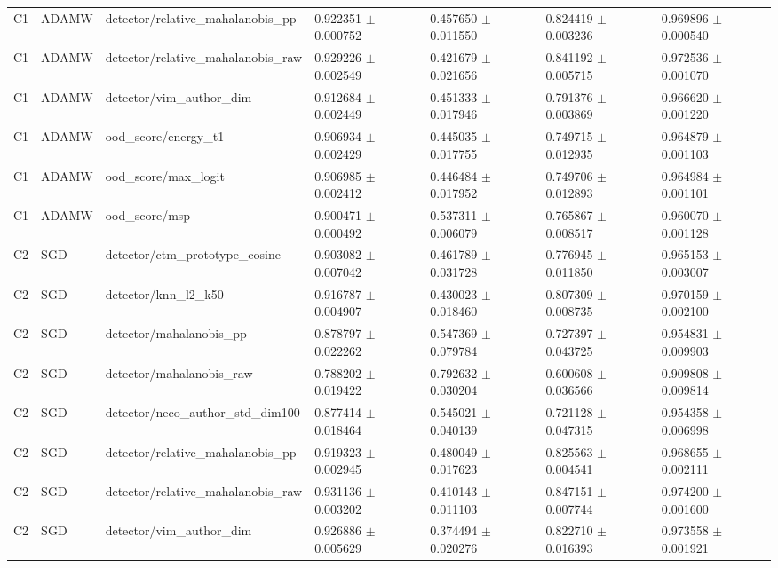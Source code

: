 \begin{longtable}{lllllll}
C1 & ADAMW & detector/relative\_mahalanobis\_pp & 0.922351 $\pm$ 0.000752 & 0.457650 $\pm$ 0.011550 & 0.824419 $\pm$ 0.003236 & 0.969896 $\pm$ 0.000540 \\
C1 & ADAMW & detector/relative\_mahalanobis\_raw & 0.929226 $\pm$ 0.002549 & 0.421679 $\pm$ 0.021656 & 0.841192 $\pm$ 0.005715 & 0.972536 $\pm$ 0.001070 \\
C1 & ADAMW & detector/vim\_author\_dim & 0.912684 $\pm$ 0.002449 & 0.451333 $\pm$ 0.017946 & 0.791376 $\pm$ 0.003869 & 0.966620 $\pm$ 0.001220 \\
C1 & ADAMW & ood\_score/energy\_t1 & 0.906934 $\pm$ 0.002429 & 0.445035 $\pm$ 0.017755 & 0.749715 $\pm$ 0.012935 & 0.964879 $\pm$ 0.001103 \\
C1 & ADAMW & ood\_score/max\_logit & 0.906985 $\pm$ 0.002412 & 0.446484 $\pm$ 0.017952 & 0.749706 $\pm$ 0.012893 & 0.964984 $\pm$ 0.001101 \\
C1 & ADAMW & ood\_score/msp & 0.900471 $\pm$ 0.000492 & 0.537311 $\pm$ 0.006079 & 0.765867 $\pm$ 0.008517 & 0.960070 $\pm$ 0.001128 \\
C2 & SGD & detector/ctm\_prototype\_cosine & 0.903082 $\pm$ 0.007042 & 0.461789 $\pm$ 0.031728 & 0.776945 $\pm$ 0.011850 & 0.965153 $\pm$ 0.003007 \\
C2 & SGD & detector/knn\_l2\_k50 & 0.916787 $\pm$ 0.004907 & 0.430023 $\pm$ 0.018460 & 0.807309 $\pm$ 0.008735 & 0.970159 $\pm$ 0.002100 \\
C2 & SGD & detector/mahalanobis\_pp & 0.878797 $\pm$ 0.022262 & 0.547369 $\pm$ 0.079784 & 0.727397 $\pm$ 0.043725 & 0.954831 $\pm$ 0.009903 \\
C2 & SGD & detector/mahalanobis\_raw & 0.788202 $\pm$ 0.019422 & 0.792632 $\pm$ 0.030204 & 0.600608 $\pm$ 0.036566 & 0.909808 $\pm$ 0.009814 \\
C2 & SGD & detector/neco\_author\_std\_dim100 & 0.877414 $\pm$ 0.018464 & 0.545021 $\pm$ 0.040139 & 0.721128 $\pm$ 0.047315 & 0.954358 $\pm$ 0.006998 \\
C2 & SGD & detector/relative\_mahalanobis\_pp & 0.919323 $\pm$ 0.002945 & 0.480049 $\pm$ 0.017623 & 0.825563 $\pm$ 0.004541 & 0.968655 $\pm$ 0.002111 \\
C2 & SGD & detector/relative\_mahalanobis\_raw & 0.931136 $\pm$ 0.003202 & 0.410143 $\pm$ 0.011103 & 0.847151 $\pm$ 0.007744 & 0.974200 $\pm$ 0.001600 \\
C2 & SGD & detector/vim\_author\_dim & 0.926886 $\pm$ 0.005629 & 0.374494 $\pm$ 0.020276 & 0.822710 $\pm$ 0.016393 & 0.973558 $\pm$ 0.001921 \\

\end{longtable}

